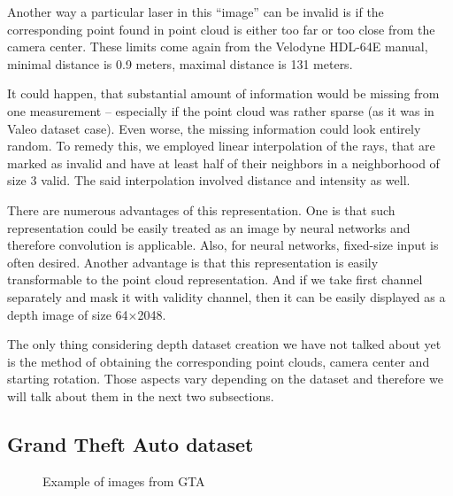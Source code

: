 Another way a particular laser in this ``image'' can be invalid is if the corresponding point found in point cloud is either too far or too close from the camera center. These limits come again from the Velodyne HDL-64E manual, minimal distance is 0.9 meters, maximal distance is 131 meters.

It could happen, that substantial amount of information would be missing from one measurement -- especially if the point cloud was rather sparse (as it was in Valeo dataset case). Even worse, the missing information could look entirely random. To remedy this, we employed linear interpolation of the rays, that are marked as invalid and have at least half of their neighbors in a neighborhood of size 3 valid. The said interpolation involved distance and intensity as well.

There are numerous advantages of this representation. One is that such representation could be easily treated as an image by neural networks and therefore convolution is applicable. Also, for neural networks, fixed-size input is often desired. Another advantage is that this representation is easily transformable to the point cloud representation. And if we take first channel separately and mask it with validity channel, then it can be easily displayed as a depth image of size 64$\times$2048.

The only thing considering depth dataset creation we have not talked about yet is the method of obtaining the corresponding point clouds, camera center and starting rotation. Those aspects vary depending on the dataset and therefore we will talk about them in the next two subsections.

\subsection{Grand Theft Auto dataset}

\begin{figure}
\centering
{}
\hfil
{}
\caption{Example of images from GTA}
\end{figure}

